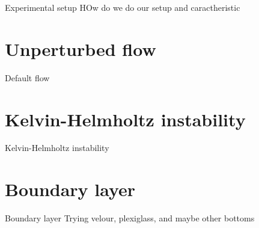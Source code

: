 \documentclass[aspectratio=169,xcolor=dvipsnames, compress]{beamer}
\begin{document}
\begin{frame}{Experimental setup}
    HOw do we do our setup and caractheristic 
\end{frame}

\section{Unperturbed flow}
\begin{frame}{Default flow}
    
\end{frame}

\section{Kelvin-Helmholtz instability}
\begin{frame}{Kelvin-Helmholtz instability}
    
\end{frame}


\section{Boundary layer}
\begin{frame}{Boundary layer}
    Trying velour, plexiglass, and maybe other bottoms 
\end{frame}

    
\end{document}
